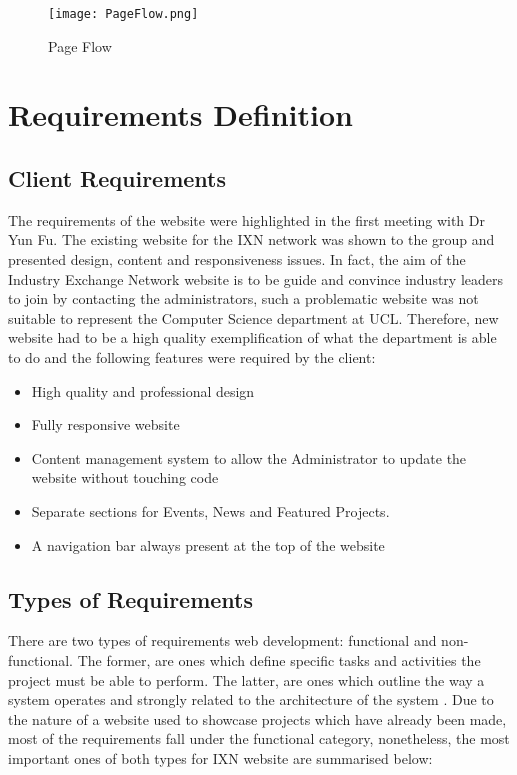 \begin{figure}[H]
      \centering
      \texttt{[image: PageFlow.png]}
      \caption{Page Flow}
      \label{PageFlow}
 \end{figure}

\newpage

\hypertarget{requirements-definition}{%
\section{Requirements Definition}\label{requirements-definition}}

\hypertarget{client-requirements}{%
\subsection{Client Requirements}\label{client-requirements}}

The requirements of the website were highlighted in the first meeting
with Dr Yun Fu. The existing website for the IXN network was shown to
the group and presented design, content and responsiveness issues. In
fact, the aim of the Industry Exchange Network website is to be guide
and convince industry leaders to join by contacting the administrators,
such a problematic website was not suitable to represent the Computer
Science department at UCL. Therefore, new website had to be a high
quality exemplification of what the department is able to do and the
following features were required by the client:

\begin{itemize}
\tightlist
\item
  High quality and professional design
\item
  Fully responsive website
\item
  Content management system to allow the Administrator to update the
  website without touching code
\item
  Separate sections for Events, News and Featured Projects.
\item
  A navigation bar always present at the top of the website
\end{itemize}

\hypertarget{types-of-requirements}{%
\subsection{Types of Requirements}\label{types-of-requirements}}

There are two types of requirements web development: functional and
non-functional. The former, are ones which define specific tasks and
activities the project must be able to perform. The latter, are ones
which outline the way a system operates and strongly related to the
architecture of the system \cite{g5}. Due to the nature of a website
used to showcase projects which have already been made, most of the
requirements fall under the functional category, nonetheless, the most
important ones of both types for IXN website are summarised below:

